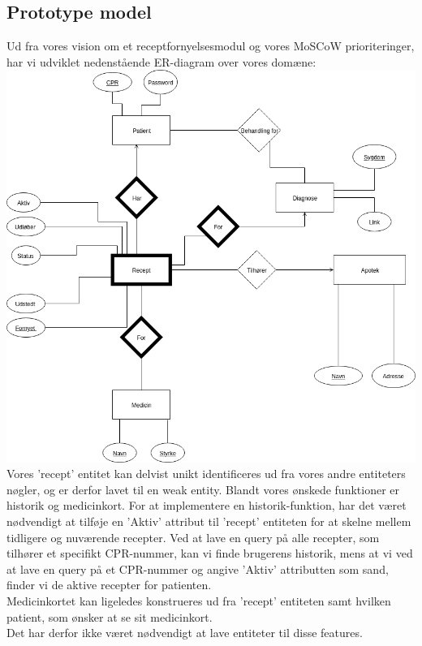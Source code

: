 \subsection{Prototype model}
Ud fra vores vision om et receptfornyelsesmodul og vores MoSCoW prioriteringer, har vi udviklet nedenstående ER-diagram over vores domæne:
\\
\includegraphics[width=\linewidth]{Materials/Prototype/NewERDiagram}\\
Vores 'recept' entitet kan delvist unikt identificeres ud fra vores andre entiteters nøgler, og er derfor lavet til en weak entity.
Blandt vores ønskede funktioner er historik og medicinkort. For at implementere en historik-funktion, har det været nødvendigt at tilføje en 'Aktiv' attribut til 'recept' entiteten for at skelne mellem tidligere og nuværende recepter. Ved at lave en query på alle recepter, som tilhører et specifikt CPR-nummer, kan vi finde brugerens historik, mens at vi ved at lave en query på et CPR-nummer og angive 'Aktiv' attributten som sand, finder vi de aktive recepter for patienten.\\
Medicinkortet kan ligeledes konstrueres ud fra 'recept' entiteten samt hvilken patient, som ønsker at se sit medicinkort.\\ 
Det har derfor ikke været nødvendigt at lave entiteter til disse features.\\

